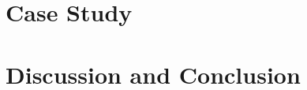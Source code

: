 \documentclass[letterpaper, 10 pt, conference]{ieeeconf}
\begin{document}
\section{Case Study}



\section{Discussion and Conclusion}

\addtolength{\textheight}{-12cm}   %







%






\end{document}
